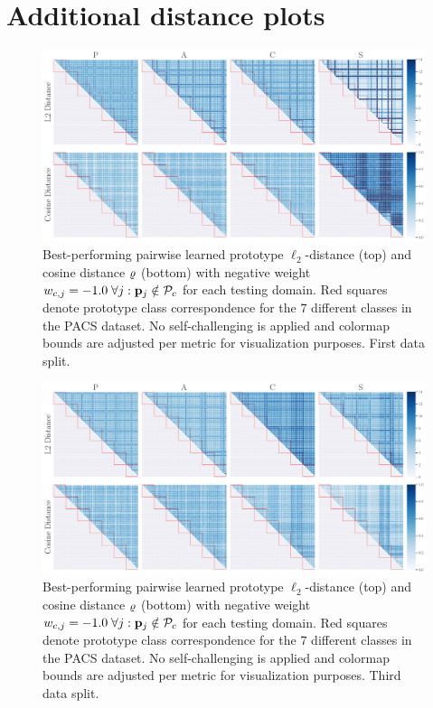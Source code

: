\chapter{Additional distance plots}
\label{sec:additional_distances}

\begin{figure}[t]
    \centering
    \includegraphics[width=\textwidth]{Figures/Chapter4/2021-01-21-ProDropIncorrectWeight-1.0SAVEResNet18oracle_validation_trial0.pdf}
    \caption[First data split pairwise prototype distances with $w_{c,j} = 0.0$] {Best-performing pairwise learned prototype $\ell_2$-distance (top) and cosine distance $\varrho$ (bottom) with negative weight $w_{c,j} = -1.0\; \forall j: \mathbf{p}_{j} \notin \mathcal{P}_c$ for each testing domain. Red squares denote prototype class correspondence for the $7$ different classes in the PACS dataset. No self-challenging is applied and colormap bounds are adjusted per metric for visualization purposes. First data split.}
    \label{fig:pairwise_distance}
\end{figure}

\begin{figure}[h]
    \centering
    \includegraphics[width=\textwidth]{Figures/Chapter4/2021-01-21-ProDropIncorrectWeight-1.0SAVEResNet18oracle_validation_trial2.pdf}
    \caption[Third data split pairwise prototype distances with $w_{c,j} = -1.0$] {Best-performing pairwise learned prototype $\ell_2$-distance (top) and cosine distance $\varrho$ (bottom) with negative weight $w_{c,j} = -1.0\; \forall j: \mathbf{p}_{j} \notin \mathcal{P}_c$ for each testing domain. Red squares denote prototype class correspondence for the $7$ different classes in the PACS dataset. No self-challenging is applied and colormap bounds are adjusted per metric for visualization purposes. Third data split.}
    \label{fig:pw_distance_trial2}
\end{figure}

